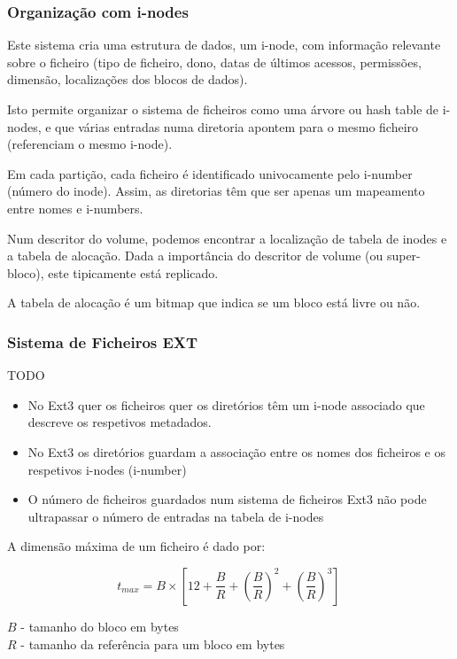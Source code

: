 \documentclass[11pt]{article}
\begin{document}
\subsubsection{Organização com i-nodes}

Este sistema cria uma estrutura de dados, um i-node, com informação relevante sobre o ficheiro (tipo de ficheiro, dono, datas de últimos acessos, permissões, dimensão, localizações dos blocos de dados).

Isto permite organizar o sistema de ficheiros como uma árvore ou hash table de i-nodes, e que várias entradas numa diretoria apontem para o mesmo ficheiro (referenciam o mesmo i-node).

Em cada partição, cada ficheiro é identificado univocamente pelo i-number (número do inode). Assim, as diretorias têm que ser apenas um mapeamento entre nomes e i-numbers.

Num descritor do volume, podemos encontrar a localização de tabela de inodes e a tabela de alocação. Dada a importância do descritor de volume (ou super-bloco), este tipicamente está replicado.

A tabela de alocação é um bitmap que indica se um bloco está livre ou não.

\subsubsection{Sistema de Ficheiros EXT}

TODO

\begin{itemize}
    \item No Ext3 quer os ficheiros quer os diretórios têm um i-node associado que descreve os respetivos metadados.
    \item No Ext3 os diretórios guardam a associação entre os nomes dos ficheiros e os respetivos i-nodes (i-number)
    \item O número de ficheiros guardados num sistema de ficheiros Ext3 não pode ultrapassar o número de entradas na tabela de i-nodes
\end{itemize}

A dimensão máxima de um ficheiro é dado por: \\[8pt]
\begin{minipage}{0.5\textwidth}
    \begin{equation*}
        t_{max} = B \times \left[12 + \frac{B}{R} + \left(\frac{B}{R}\right)^2
            + \left(\frac{B}{R}\right)^3 \right]\
    \end{equation*}
\end{minipage}
\begin{minipage}{0.495\textwidth}
    $B$ - tamanho do bloco em bytes \\
    $R$ - tamanho da referência para um bloco em bytes
\end{minipage}
\end{document}
